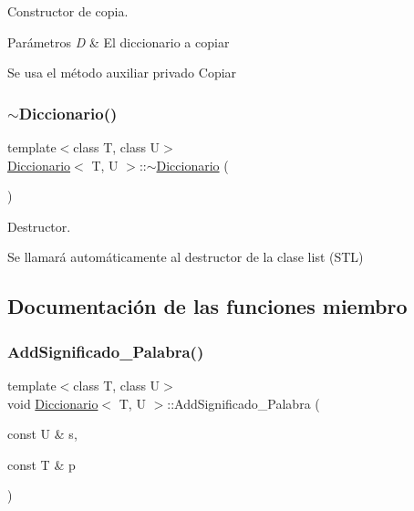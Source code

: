 Constructor de copia. 


\begin{DoxyParams}{Parámetros}
{\em D} & El diccionario a copiar\\
\hline
\end{DoxyParams}
Se usa el método auxiliar privado Copiar \mbox{\label{classDiccionario_a006b21559ae7e1b449c785fc47dfb04d}} 
\subsubsection{\texorpdfstring{$\sim$\+Diccionario()}{~Diccionario()}}
{\footnotesize\ttfamily template$<$class T, class U$>$ \\
\hyperlink{classDiccionario}{Diccionario}$<$ T, U $>$\+::$\sim$\hyperlink{classDiccionario}{Diccionario} (\begin{DoxyParamCaption}{ }\end{DoxyParamCaption})\hspace{0.3cm}{\ttfamily [inline]}}



Destructor. 

Se llamará automáticamente al destructor de la clase list (S\+TL) 

\subsection{Documentación de las funciones miembro}
\mbox{\label{classDiccionario_a7e167da231bff610001df3c20cc9b7a7}} 
\subsubsection{\texorpdfstring{Add\+Significado\+\_\+\+Palabra()}{AddSignificado\_Palabra()}}
{\footnotesize\ttfamily template$<$class T, class U$>$ \\
void \hyperlink{classDiccionario}{Diccionario}$<$ T, U $>$\+::Add\+Significado\+\_\+\+Palabra (\begin{DoxyParamCaption}\item[{const U \&}]{s,  }\item[{const T \&}]{p }\end{DoxyParamCaption})\hspace{0.3cm}{\ttfamily [inline]}}



